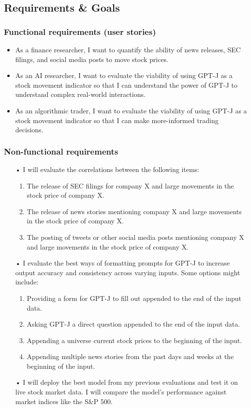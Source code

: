 \documentclass[conference]{IEEEtran}
\begin{document}
\subsection{\textbf{Requirements \& Goals}}
\subsubsection{Functional requirements (user stories)}
\begin{itemize}
\item As a finance researcher, I want to quantify the ability of news releases, SEC filings, and social media posts to move stock prices.
\item As an AI researcher, I want to evaluate the viability of using GPT-J as a stock movement indicator so that I can understand the power of GPT-J to understand complex real-world interactions.
\item As an algorithmic trader, I want to evaluate the viability of using GPT-J as a stock movement indicator so that I can make more-informed trading decisions.
\end{itemize}
\subsubsection{Non-functional requirements}
\begin{enumerate}
    \item[•] I will evaluate the correlations between the following items:
    \begin{enumerate}
        \item The release of SEC filings for company X and large movements in the stock price of company X.
        \item The release of news stories mentioning company X and large movements in the stock price of company X.
        \item The posting of tweets or other social media posts mentioning company X and large movements in the stock price of company X.
    \end{enumerate}
    \item[•] I evaluate the best ways of formatting prompts for GPT-J to increase output accuracy and consistency across varying inputs. Some options might include:
    \begin{enumerate}
        \item Providing a form for GPT-J to fill out appended to the end of the input data.
        \item Asking GPT-J a direct question appended to the end of the input data.
        \item Appending a universe current stock prices to the beginning of the input.
        \item Appending multiple news stories from the past days and weeks at the beginning of the input.
    \end{enumerate}
    \item[•] I will deploy the best model from my previous evaluations and test it on live stock market data. I will compare the model's performance against market indices like the S\&P 500. 
\end{enumerate}
\end{document}
